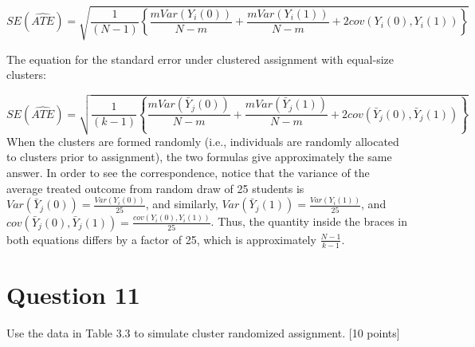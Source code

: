 \documentclass[11pt,notitlepage]{article}\usepackage[]{graphicx}\usepackage[]{color}
\begin{document}
\begin{equation*}
SE(\widehat{ATE}) = \sqrt{\frac{1}{(N-1)} \left \{ \frac{mVar(Y_i (0))}{N- m} + \frac{mVar(Y_i (1))}{N- m} + 2cov(Y_i(0), Y_i(1))\right \}}
\end{equation*}

The equation for the standard error under clustered assignment with equal-size clusters:

\begin{equation*}
SE(\widehat{ATE}) = \sqrt{\frac{1}{(k-1)} \left \{ \frac{mVar(\bar{Y}_j (0))}{N- m} + \frac{mVar(\bar{Y}_j (1))}{N- m} + 2cov(\bar{Y}_j(0), \bar{Y}_j(1))\right \}}
\end{equation*}
When the clusters are formed randomly (i.e., individuals are randomly allocated to clusters prior to assignment), the two formulas give approximately the same answer. In order to see the correspondence, notice that the variance of the average treated outcome from random draw of 25 students is $Var(\bar{Y}_j(0)) = \frac{Var(Y_i (0))}{25}$, and similarly, $Var(\bar{Y}_j(1)) = \frac{Var(Y_i (1))}{25}$, and $cov(\bar{Y}_j(0), \bar{Y}_j(1)) = \frac{cov(Y_i(0), Y_i(1))}{25}$. Thus, the quantity inside the braces in both equations differs by a factor of 25, which is approximately $\frac{N-1}{k-1}$.

\section*{Question 11}

Use the data in Table 3.3 to simulate cluster randomized assignment. [10 points]
\end{document}
